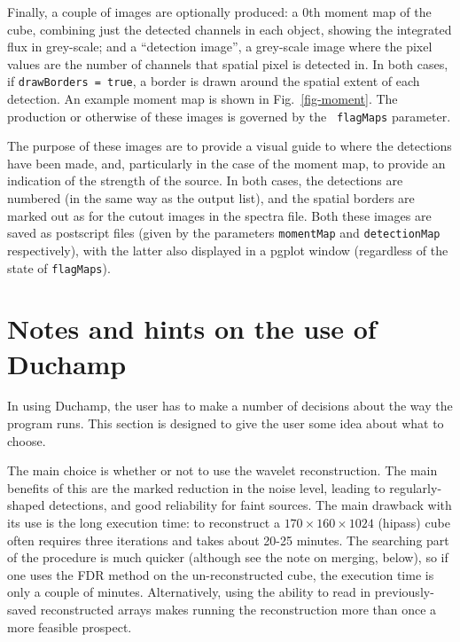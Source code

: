 \documentclass[12pt,a4paper]{article}
\newcommand{\ie}{i.e.\ }
\newcommand{\hipass}{{\sc hipass}}
\begin{document}
Finally, a couple of images are optionally produced: a 0th moment map
of the cube, combining just the detected channels in each object,
showing the integrated flux in grey-scale; and a ``detection image'',
a grey-scale image where the pixel values are the number of channels
that spatial pixel is detected in. In both cases, if {\tt drawBorders =
true}, a border is drawn around the spatial extent of each
detection. An example moment map is shown in Fig.~\ref{fig-moment}.
The production or otherwise of these images is governed by the {\tt
flagMaps} parameter.

The purpose of these images are to provide a visual guide to where the
detections have been made, and, particularly in the case of the moment
map, to provide an indication of the strength of the source. In both
cases, the detections are numbered (in the same way as the output
list), and the spatial borders are marked out as for the cutout images
in the spectra file. Both these images are saved as postscript files
(given by the parameters {\tt momentMap} and {\tt detectionMap}
respectively), with the latter also displayed in a {\sc pgplot}
window (regardless of the state of {\tt flagMaps}).

\section{Notes and hints on the use of Duchamp}

In using Duchamp, the user has to make a number of decisions about
the way the program runs. This section is designed to give the user
some idea about what to choose.

The main choice is whether or not to use the wavelet
reconstruction. The main benefits of this are the marked reduction in
the noise level, leading to regularly-shaped detections, and good
reliability for faint sources. The main drawback with its use is the
long execution time: to reconstruct a $170\times160\times1024$
(\hipass) cube often requires three iterations and takes about 20-25
minutes. The searching part of the procedure is much quicker (although
see the note on merging, below), so if one uses the FDR method on the
un-reconstructed cube, the execution time is only a couple of
minutes. Alternatively, using the ability to read in previously-saved
reconstructed arrays makes running the reconstruction more than once a
more feasible prospect.

\end{document}

